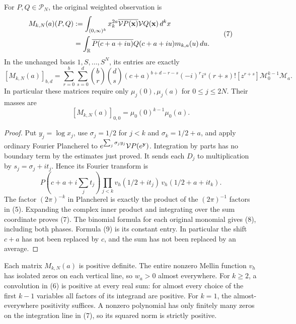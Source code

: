 \begin{latecontroltheorem}
For \(P,Q\in\mathcal P_N\), the original weighted observation is
\[
 \begin{split}
 M_{k,N}(a)(P,Q)
 &:=\int_{(0,\infty)^k}x_k^{2a}
                 \overline{\mathcal V P(\mathbf x)}\mathcal V Q(\mathbf x)\,d^kx\\
 &=\int_{\mathbb R}\overline{P(c+a+iu)}Q(c+a+iu)
                 m_{k,a}(u)\,du.
 \end{split}
 \tag{7}
\]
In the unchanged basis \(1,S,\ldots,S^N\), its entries are exactly
\[
 [M_{k,N}(a)]_{b,d}
 =\sum_{r=0}^b\sum_{s=0}^d
 \binom br\binom ds(c+a)^{b+d-r-s}(-i)^ri^s
 (r+s)![z^{r+s}]\mathcal M_0^{k-1}\mathcal M_a.
 \tag{8}
\]
In particular these matrices require only \(\mu_j(0),\mu_j(a)\)
for \(0\le j\le2N\). Their masses are
\[
 [M_{k,N}(a)]_{0,0}=\mu_0(0)^{k-1}\mu_0(a).
 \tag{9}
\]
\end{latecontroltheorem}
\begin{proof}
Put \(y_j=\log x_j\), use \(\sigma_j=1/2\) for \(j<k\) and
\(\sigma_k=1/2+a\), and apply ordinary Fourier Plancherel to
\(e^{\sum_j\sigma_jy_j}\mathcal V P(e^{\mathbf y})\). Integration by
parts has no boundary term by the estimates just proved. It sends each
\(D_j\) to multiplication by \(s_j=\sigma_j+it_j\). Hence its
Fourier transform is
\[
 P(c+a+i\textstyle\sum_jt_j)
 \prod_{j<k}v_h(1/2+it_j)\,v_h(1/2+a+it_k).
\]
The factor \((2\pi)^{-k}\) in Plancherel is exactly the product of
the \((2\pi)^{-1}\) factors in (5). Expanding the complex inner
product and integrating over the sum coordinate proves (7). The
binomial formula for each original monomial gives (8), including both
phases. Formula (9) is its constant entry. In particular the shift
\(c+a\) has not been replaced by \(c\), and the sum has not been
replaced by an average.
\end{proof}

Each matrix \(M_{k,N}(a)\) is positive definite. The entire nonzero
Mellin function \(v_h\) has isolated zeros on each vertical line, so
\(w_a>0\) almost everywhere. For \(k\ge2\), a convolution in (6)
is positive at every real sum: for almost every choice of the first
\(k-1\) variables all factors of its integrand are positive. For
\(k=1\), the almost-everywhere positivity suffices. A nonzero
polynomial has only finitely many zeros on the integration line in
(7), so its squared norm is strictly positive.

